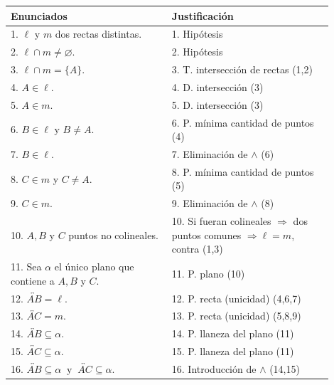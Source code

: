 \documentclass[12pt,letterpaper]{exam}
\begin{document}
\begin{enumerate}
\begin{enumerate}[label=\alph*)]
\begin{center}
      \begin{tabular}{|p{0.45\linewidth}|p{0.45\linewidth}|}
      \hline
      \textbf{Enunciados} & \textbf{Justificación} \\
      \hline
      1. $\ell$ y $m$ dos rectas distintas. & 1. Hipótesis \\
      \hline
      2. $\ell \cap m \neq \varnothing$. & 2. Hipótesis \\
      \hline
      3. $\ell \cap m = \{A\}$. & 3. T. intersección de rectas (1,2) \\
      \hline
      4. $A \in \ell$. & 4. D. intersección (3) \\
      \hline
      5. $A \in m$. & 5. D. intersección (3) \\
      \hline
      6. $B \in \ell$ y $B \neq A$. & 6. P. mínima cantidad de puntos (4) \\
      \hline
      7. $B \in \ell$. & 7. Eliminación de $\land$ (6) \\
      \hline
      8. $C \in m$ y $C \neq A$. & 8. P. mínima cantidad de puntos (5) \\
      \hline
      9. $C \in m$. & 9. Eliminación de $\land$ (8) \\
      \hline
      10. $A, B$ y $C$ puntos no colineales. & 10. Si fueran colineales $\Rightarrow$ dos puntos comunes $\Rightarrow \ell=m$, contra (1,3) \\
      \hline
      11. Sea $\alpha$ el único plano que contiene a $A, B$ y $C$. & 11. P. plano (10) \\
      \hline
      \vspace{0.001em}
      12. $\overleftrightarrow{AB} = \ell$. & 12. P. recta (unicidad) (4,6,7) \\
      \hline
      \vspace{0.001em}
      13. $\overleftrightarrow{AC} = m$. & 13. P. recta (unicidad) (5,8,9) \\
      \hline
      \vspace{0.001em}
      14. $\overleftrightarrow{AB} \subseteq \alpha$. & 14. P. llaneza del plano (11) \\
      \hline
      \vspace{0.001em}
      15. $\overleftrightarrow{AC} \subseteq \alpha$. & 15. P. llaneza del plano (11) \\
      \hline
      \vspace{0.001em}
      16. $\overleftrightarrow{AB} \subseteq \alpha \;\; \text{y} \;\; \overleftrightarrow{AC} \subseteq \alpha$. & 16. Introducción de $\land$ (14,15) \\
      \hline
      \end{tabular}
\end{center}



\end{enumerate} %

\end{enumerate} %
\end{document}
